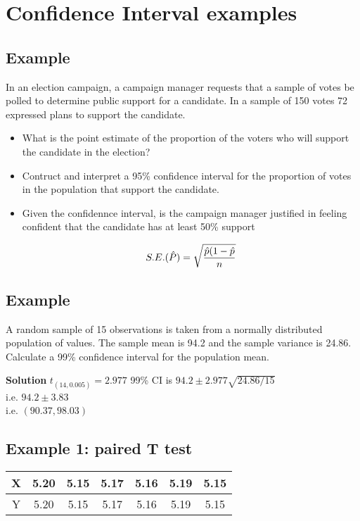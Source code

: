 \documentclass[]{report}
\begin{document}
\section{Confidence Interval examples}


\subsection{Example}
In an election campaign, a campaign manager requests that a sample of votes be polled to determine public support for a candidate. In a sample of 150 votes 72 expressed plans to support the candidate.



\begin{itemize}
	\item What is the point estimate of the proportion of the voters who will support the candidate in the election?
	\item Contruct and interpret a 95\% confidence interval for the proportion of votes in the population that support the candidate.
	
	\item Given the confidennce interval, is the campaign manager justified in feeling confident that the candidate has at least 50\% support
	
	\[S.E. (\hat{P}) = \sqrt{{\hat{p}(1-\hat{p} \over n}}\]
\end{itemize}


\subsection{Example}
A random sample of 15 observations is taken from a normally distributed population
of values. The sample mean is 94.2 and the sample variance is 24.86.
Calculate a 99\% confidence interval for the population mean.


\noindent \textbf{Solution}
$t_(14,0.005) = 2.977$
99\% CI is $94.2 \pm 2.977 \sqrt{24.86/15}$ \\i.e. $94.2 \pm 3.83$ \\i.e. $(90.37,98.03)$


\subsection{Example 1: paired T test}

\begin{center}
	\begin{tabular}{|c|c|c|c|c|c|c|}
		\hline
		X & 5.20 & 5.15 & 5.17 & 5.16 & 5.19 & 5.15\\ \hline 
		Y & 5.20 & 5.15 & 5.17 & 5.16 & 5.19 & 5.15\\
		\hline
	\end{tabular}
\end{center}
\end{document}
